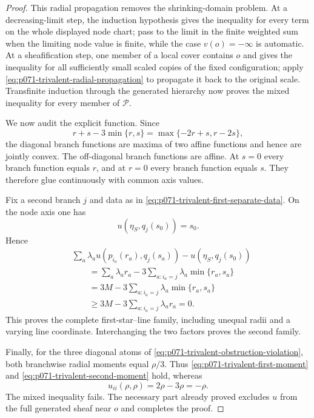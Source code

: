 \begin{proof}
This radial propagation removes the shrinking-domain problem.  At a
decreasing-limit step, the induction hypothesis gives the inequality for
every term on the whole displayed node chart; pass to the limit in the
finite weighted sum when the limiting node value is finite, while the case
$v(o)=-\infty$ is automatic.  At a sheafification step, one member of a
local cover contains $o$ and gives the inequality for all sufficiently
small scaled copies of the fixed configuration; apply
\eqref{eq:p071-trivalent-radial-propagation} to propagate it back to the
original scale.  Transfinite induction through the generated hierarchy now
proves the mixed inequality for every member of $\mathcal P$.

We now audit the explicit function.  Since
\begin{equation}
 r+s-3\min\{r,s\}
       =\max\{-2r+s,r-2s\},
 \label{eq:p071-trivalent-diagonal-convexity}
\end{equation}
the diagonal branch functions are maxima of two affine functions and hence
are jointly convex.  The off-diagonal branch functions are affine.  At
$s=0$ every branch function equals $r$, and at $r=0$ every branch function
equals $s$.  They therefore glue continuously with common axis values.

Fix a second branch $j$ and data as in
\eqref{eq:p071-trivalent-first-separate-data}.  On the node axis one has
\[
                         u(\eta_S,q_j(s_0))=s_0.
\]
Hence
\begin{align*}
 &\sum_a\lambda_a
       u(p_{i_a}(r_a),q_j(s_a))-u(\eta_S,q_j(s_0))\\
 &\qquad=
   \sum_a\lambda_ar_a
      -3\sum_{a:i_a=j}\lambda_a\min\{r_a,s_a\}\\
 &\qquad=3M
      -3\sum_{a:i_a=j}\lambda_a\min\{r_a,s_a\}\\
 &\qquad\geq
   3M-3\sum_{a:i_a=j}\lambda_ar_a=0.
\end{align*}
This proves the complete first-star--line family, including unequal radii
and a varying line coordinate.  Interchanging the two factors proves the
second family.

Finally, for the three diagonal atoms of
\eqref{eq:p071-trivalent-obstruction-violation}, both branchwise radial
moments equal $\rho/3$.  Thus
\eqref{eq:p071-trivalent-first-moment} and
\eqref{eq:p071-trivalent-second-moment} hold, whereas
\[
 u_{ii}(\rho,\rho)=2\rho-3\rho=-\rho.
\]
The mixed inequality fails.  The necessary part already proved excludes
$u$ from the full generated sheaf near $o$ and completes the proof.
\end{proof}
